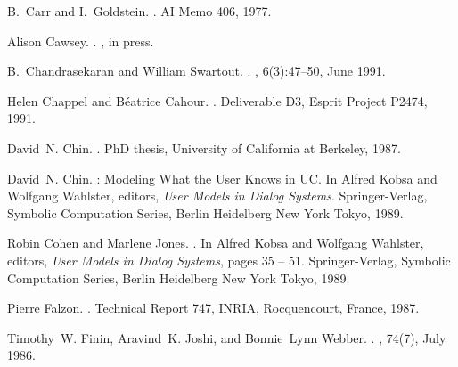 \documentclass{kluwer}    %
\begin{document}
\begin{article}
\begin{thebibliography}{}
B.~Carr and I.~Goldstein.
.
\newblock AI Memo 406, 1977.

Alison Cawsey.
.
, in press.
                                                               
B.~Chandrasekaran and William Swartout.
.
, 6(3):47--50, June 1991.

Helen Chappel and B\'eatrice Cahour.
.
\newblock Deliverable D3, Esprit Project P2474, 1991.

David~N. Chin.
.
\newblock PhD thesis, University of California at Berkeley, 1987.

David~N. Chin.
: {M}odeling {W}hat the {U}ser {K}nows in {UC}.
\newblock In Alfred Kobsa and Wolfgang Wahlster, editors, {\em User Models in
  Dialog Systems}. Springer-Verlag, Symbolic Computation Series, Berlin
  Heidelberg New York Tokyo, 1989.

Robin Cohen and Marlene Jones.
.
\newblock In Alfred Kobsa and Wolfgang Wahlster, editors, {\em User Models in
  Dialog Systems}, pages 35 -- 51. Springer-Verlag, Symbolic Computation
  Series, Berlin Heidelberg New York Tokyo, 1989.

Pierre Falzon.
.
\newblock Technical Report 747, INRIA, Rocquencourt, France, 1987.

Timothy~W. Finin, Aravind~K. Joshi, and Bonnie~Lynn Webber.
.
, 74(7), July 1986.

\end{thebibliography}
\end{article}
\end{document}
